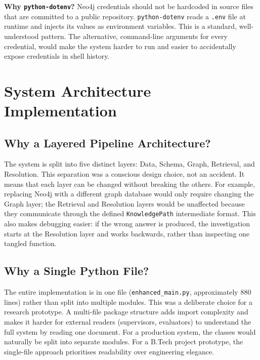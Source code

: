 \textbf{Why \texttt{python-dotenv}?}
Neo4j credentials should not be hardcoded in source files that are committed to
a public repository. \texttt{python-dotenv} reads a \texttt{.env} file at
runtime and injects its values as environment variables. This is a standard,
well-understood pattern. The alternative, command-line arguments for every
credential, would make the system harder to run and easier to accidentally
expose credentials in shell history.

\section{System Architecture Implementation}

\subsection{Why a Layered Pipeline Architecture?}

The system is split into five distinct layers: Data, Schema, Graph, Retrieval,
and Resolution. This separation was a conscious design choice, not an accident.
It means that each layer can be changed without breaking the others. For example,
replacing Neo4j with a different graph database would only require changing the
Graph layer; the Retrieval and Resolution layers would be unaffected because they
communicate through the defined \texttt{KnowledgePath} intermediate format. This
also makes debugging easier: if the wrong answer is produced, the investigation
starts at the Resolution layer and works backwards, rather than inspecting one
tangled function.

\subsection{Why a Single Python File?}

The entire implementation is in one file (\texttt{enhanced\_main.py}, approximately
880 lines) rather than split into multiple modules. This was a deliberate choice
for a research prototype. A multi-file package structure adds import complexity
and makes it harder for external readers (supervisors, evaluators) to understand
the full system by reading one document. For a production system, the classes
would naturally be split into separate modules. For a B.Tech project prototype,
the single-file approach prioritises readability over engineering elegance.

